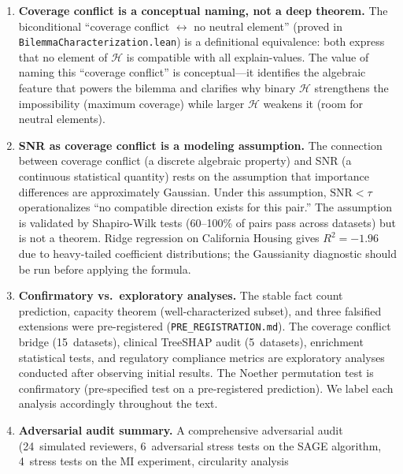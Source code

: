 \documentclass[11pt,a4paper]{article}
\begin{document}
\begin{enumerate}[label=(\arabic*)]
The drug discovery experiment (Section~\ref{sec:drug-discovery}) demonstrates this bottleneck concretely: Pearson-based clustering predicts 0\% instability on binary fingerprints while MI-based clustering recovers the observed 23\% rate within 16\%. However, the Noether bimodal structure transfers only for domains with discrete group structure, not for diffuse overlap patterns.
  \item \textbf{Coverage conflict is a conceptual naming, not a deep theorem.}  The biconditional ``coverage conflict $\leftrightarrow$ no neutral element'' (proved in \texttt{BilemmaCharacterization.lean}) is a definitional equivalence: both express that no element of $\mathcal{H}$ is compatible with all explain-values.  The value of naming this ``coverage conflict'' is conceptual---it identifies the algebraic feature that powers the bilemma and clarifies why binary $\mathcal{H}$ strengthens the impossibility (maximum coverage) while larger $\mathcal{H}$ weakens it (room for neutral elements).
  \item \textbf{SNR as coverage conflict is a modeling assumption.}  The connection between coverage conflict (a discrete algebraic property) and SNR (a continuous statistical quantity) rests on the assumption that importance differences are approximately Gaussian.  Under this assumption, $\text{SNR} < \tau$ operationalizes ``no compatible direction exists for this pair.''  The assumption is validated by Shapiro-Wilk tests (60--100\% of pairs pass across datasets) but is not a theorem.  Ridge regression on California Housing gives $R^2 = -1.96$ due to heavy-tailed coefficient distributions; the Gaussianity diagnostic should be run before applying the formula.
  \item \textbf{Confirmatory vs.\ exploratory analyses.}  The stable fact count prediction, capacity theorem (well-characterized subset), and three falsified extensions were pre-registered (\texttt{PRE\_REGISTRATION.md}).  The coverage conflict bridge (15~datasets), clinical TreeSHAP audit (5~datasets), enrichment statistical tests, and regulatory compliance metrics are exploratory analyses conducted after observing initial results.  The Noether permutation test is confirmatory (pre-specified test on a pre-registered prediction).  We label each analysis accordingly throughout the text.
  \item \textbf{Adversarial audit summary.}  A comprehensive adversarial
    audit (24~simulated reviewers, 6~adversarial stress tests on the SAGE
    algorithm, 4~stress tests on the MI experiment, circularity analysis

\end{enumerate}
\end{document}
